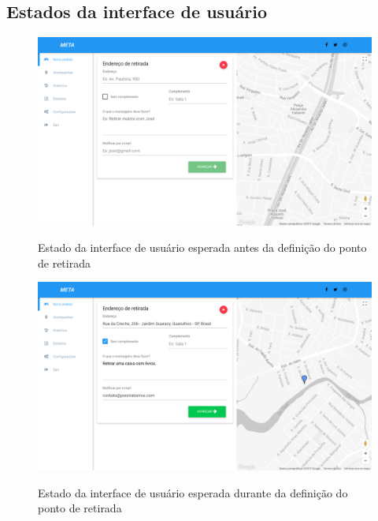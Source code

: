 \begin{apendicesenv}
\partapendices

\chapter{Estados da interface de usuário}
\label{apend:estados-interface}

		\begin{figure}[!h]
			\centering
			\caption{Estado da interface de usuário esperada antes da definição do ponto de retirada}
			\includegraphics[width=1\textwidth]{./img/antes-retirada}
			\label{fig:antes-retirada}
		\end{figure}
		
		\begin{figure}[!h]
			\centering
			\caption{Estado da interface de usuário esperada durante da definição do ponto de retirada}
			\includegraphics[width=1\textwidth]{./img/durante-retirada}
			\label{fig:durante-retirada}
		\end{figure}
		

\end{apendicesenv}
